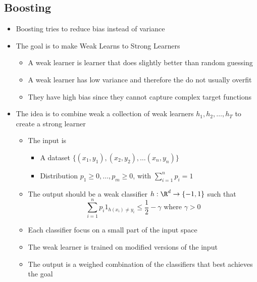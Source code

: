 \documentclass[a4, english]{article}
\begin{document}
\subsection{Boosting}
\begin{itemize}
	\item Boosting tries to reduce bias instead of variance  
  \item The goal is to make Weak Learns to Strong Learners   
  \begin{itemize}
  	\item A weak learner is learner that does slightly better than random guessing 
    \item A weak learner has low variance and therefore the do not usually overfit
    \item They have high bias since they cannot capture complex target functions 
  \end{itemize}
  \item The idea is to combine weak a collection of weak learners $h_1, h_2, \dots, h_T$ to create a strong learner
  \begin{itemize}
    \item The input is
    \begin{itemize}
      \item A dataset $\{(x_1, y_1), (x_2, y_2), \dots  (x_n, y_n)\}$  
      \item Distribution $p_1 \geq 0, \dots, p_m \geq 0$, with $\sum_{i=1}^n p_i = 1$ 
    \end{itemize}
    \item The output should be a weak classifier $h: \R^d \to \{-1,1\}$ such that
    \begin{equation*}
       \sum_{i=1}^np_i1_{h(x_i) \ne y_i} \leq \frac12 - \gamma \text{ where } \gamma > 0 
    \end{equation*}
    \item Each classifier focus on a small part of the input space
    \item The weak learner is trained on modified versions of the input 
    \item The output is a weighed combination of the classifiers that best achieves the goal
  \end{itemize}
\end{itemize}
\end{document}
